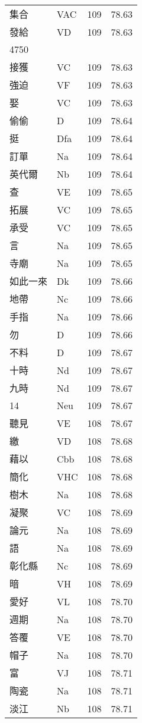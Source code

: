 \documentclass[twocolumn]{book}
\begin{document}
\begin{supertabular}{llrr}
集合 & VAC & 109 &  78.63\\
發給 & VD & 109 &  78.63\\
4750\\
接獲 & VC & 109 &  78.63\\
強迫 & VF & 109 &  78.63\\
娶 & VC & 109 &  78.63\\
偷偷 & D & 109 &  78.64\\
挺 & Dfa & 109 &  78.64\\
訂單 & Na & 109 &  78.64\\
英代爾 & Nb & 109 &  78.64\\
查 & VE & 109 &  78.65\\
拓展 & VC & 109 &  78.65\\
承受 & VC & 109 &  78.65\\
言 & Na & 109 &  78.65\\
寺廟 & Na & 109 &  78.65\\
如此一來 & Dk & 109 &  78.66\\
地帶 & Nc & 109 &  78.66\\
手指 & Na & 109 &  78.66\\
勿 & D & 109 &  78.66\\
不料 & D & 109 &  78.67\\
十時 & Nd & 109 &  78.67\\
九時 & Nd & 109 &  78.67\\
14 & Neu & 109 &  78.67\\
聽見 & VE & 108 &  78.67\\
繳 & VD & 108 &  78.68\\
藉以 & Cbb & 108 &  78.68\\
簡化 & VHC & 108 &  78.68\\
樹木 & Na & 108 &  78.68\\
凝聚 & VC & 108 &  78.69\\
論元 & Na & 108 &  78.69\\
語 & Na & 108 &  78.69\\
彰化縣 & Nc & 108 &  78.69\\
暗 & VH & 108 &  78.69\\
愛好 & VL & 108 &  78.70\\
週期 & Na & 108 &  78.70\\
答覆 & VE & 108 &  78.70\\
帽子 & Na & 108 &  78.70\\
富 & VJ & 108 &  78.71\\
陶瓷 & Na & 108 &  78.71\\
淡江 & Nb & 108 &  78.71\\

\end{supertabular}
\end{document}
